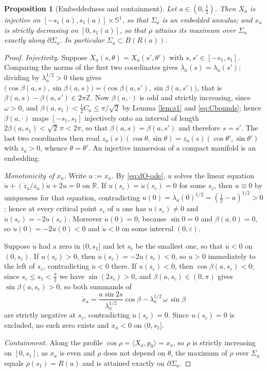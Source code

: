 \documentclass[10pt,a4paper]{amsart}
\newtheorem{proposition}[theorem]{Proposition}
\newcommand{\R}{\mathbb{R}}
\newcommand{\Sph}{\mathbb{S}}
\begin{document}
\begin{proposition}[Embeddedness and containment]\label{prop:embcont}
Let $a\in(0,\tfrac12)$. Then $X_a$ is injective on $[-s_1(a),s_1(a)]\times\Sph^1$, so that $\Sigma_a$ is an embedded annulus; and $x_a$ is strictly decreasing on $[0,s_1(a)]$, so that $\rho$ attains its maximum over $\Sigma_a$ exactly along $\partial\Sigma_a$. In particular $\Sigma_a\subset B(R(a))$.
\end{proposition}

\begin{proof}
\emph{Injectivity.} Suppose $X_a(s,\theta)=X_a(s',\theta')$ with $s,s'\in[-s_1,s_1]$. Comparing the norms of the first two coordinates gives $\lambda_a(s)=\lambda_a(s')$; dividing by $\lambda_a^{1/2}>0$ then gives $\bigl(\cos\beta(a,s),\sin\beta(a,s)\bigr)=\bigl(\cos\beta(a,s'),\sin\beta(a,s')\bigr)$, that is $\beta(a,s)-\beta(a,s')\in 2\pi\mathbb{Z}$. Now $\beta(a,\cdot)$ is odd and strictly increasing, since $\omega>0$, and $\beta(a,s_1)<\tfrac12 C_a\leq\pi/\sqrt2$ by Lemma \ref{lem:s1} and \eqref{eq:Cbounds}; hence $\beta(a,\cdot)$ maps $[-s_1,s_1]$ injectively onto an interval of length $2\beta(a,s_1)<\sqrt2\,\pi<2\pi$, so that $\beta(a,s)=\beta(a,s')$ and therefore $s=s'$. The last two coordinates then read $z_a(s)(\cos\theta,\sin\theta)=z_a(s)(\cos\theta',\sin\theta')$ with $z_a>0$, whence $\theta=\theta'$. An injective immersion of a compact manifold is an embedding.

\emph{Monotonicity of $x_a$.} Write $u:=x_a$. By \eqref{eq:dO-ode}, $u$ solves the linear equation $\ddot u+(\dot z_a/z_a)\dot u+2u=0$ on $\R$. If $u(s_c)=\dot u(s_c)=0$ for some $s_c$, then $u\equiv 0$ by uniqueness for that equation, contradicting $u(0)=\lambda_a(0)^{1/2}=(\tfrac12-a)^{1/2}>0$; hence at every critical point $s_c$ of $u$ one has $u(s_c)\neq 0$ and $\ddot u(s_c)=-2u(s_c)$. Moreover $\dot u(0)=0$, because $\sin 0=0$ and $\beta(a,0)=0$, so $\ddot u(0)=-2u(0)<0$ and $\dot u<0$ on some interval $(0,\varepsilon)$.

Suppose $\dot u$ had a zero in $(0,s_1]$ and let $s_c$ be the smallest one, so that $\dot u<0$ on $(0,s_c)$. If $u(s_c)>0$, then $\ddot u(s_c)=-2u(s_c)<0$, so $\dot u>0$ immediately to the left of $s_c$, contradicting $\dot u<0$ there. If $u(s_c)<0$, then $\cos\beta(a,s_c)<0$; since $s_c\leq s_1<\tfrac\pi2$ we have $\sin(2s_c)>0$, and $\beta(a,s_c)\in(0,\pi)$ gives $\sin\beta(a,s_c)>0$, so both summands of
\[
\dot x_a=\frac{a\sin 2s}{\lambda_a^{1/2}}\cos\beta-\lambda_a^{1/2}\,\omega\,\sin\beta
\]
are strictly negative at $s_c$, contradicting $\dot u(s_c)=0$. Since $u(s_c)=0$ is excluded, no such zero exists and $\dot x_a<0$ on $(0,s_1]$.

\emph{Containment.} Along the profile $\cos\rho=\langle X_a,p_0\rangle=x_a$, so $\rho$ is strictly increasing on $[0,s_1]$; as $x_a$ is even and $\rho$ does not depend on $\theta$, the maximum of $\rho$ over $\Sigma_a$ equals $\rho(s_1)=R(a)$ and is attained exactly on $\partial\Sigma_a$.
\end{proof}
\end{document}
